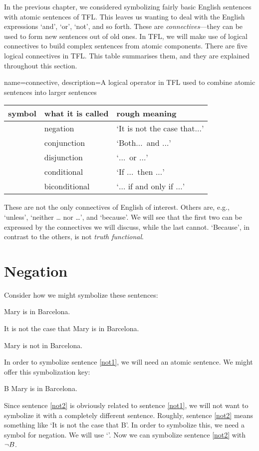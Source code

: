 In the previous chapter, we considered symbolizing fairly basic English sentences with atomic sentences of TFL. This leaves us wanting to deal with the English expressions `and', `or', `not', and so forth. These are \emph{connectives}---they can be used to form new sentences out of old ones. In TFL, we will make use of logical connectives to build complex sentences from atomic components. There are five logical connectives in TFL. This table summarises them, and they are explained throughout this section.

{
name=connective,
description={A logical operator in TFL used to combine \glspl{atomic sentence} into larger sentences}
}
	\begin{table}[h]
	\center
	\begin{tabular}{l l l}

	\textbf{symbol}&\textbf{what it is called}&\textbf{rough meaning}\\
	\hline
	\enot&negation&`It is not the case that$\ldots$'\\
	\eand&conjunction&`Both$\ldots$\ and $\ldots$'\\
	\eor&disjunction&`$\ldots$\ or $\ldots$'\\
	\eif&conditional&`If $\ldots$\ then $\ldots$'\\
	\eiff&biconditional&`$\ldots$ if and only if $\ldots$'\\

	\end{tabular}
	\end{table}

These are not the only connectives of English of interest. Others are, e.g., `unless', `neither \dots{} nor \dots', and `because'. We will see that the first two can be expressed by the connectives we will discuss, while the last cannot. `Because', in contrast to the others, is not \emph{truth functional}.


\section{Negation}

Consider how we might symbolize these sentences:
	\begin{earg}
	\item[\ex{not1}] Mary is in Barcelona.
	\item[\ex{not2}] It is not the case that Mary is in Barcelona.
	\item[\ex{not3}] Mary is not in Barcelona.
	\end{earg}
In order to symbolize sentence \ref{not1}, we will need an atomic sentence. We might offer this symbolization key:
	\begin{ekey}
		\item[B] Mary is in Barcelona.
	\end{ekey}
Since sentence \ref{not2} is obviously related to  sentence \ref{not1}, we will not want to symbolize it with a completely different sentence. Roughly, sentence \ref{not2} means something like `It is not the case that B'. In order to symbolize this, we need a symbol for negation. We will use `\enot'. Now we can symbolize sentence \ref{not2} with $\neg B$.

